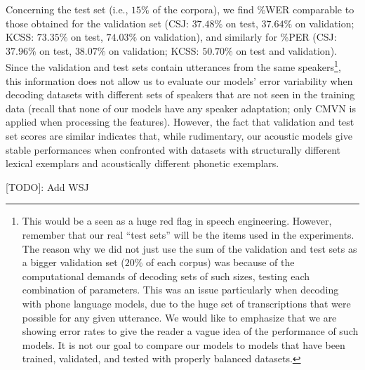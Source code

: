 Concerning the test set (i.e., $15\%$ of the corpora), we find \%WER comparable to those obtained for the validation set (CSJ: $37.48\%$ on test, $37.64\%$ on validation; KCSS: $73.35\%$ on test, $74.03\%$ on validation), and similarly for \%PER (CSJ: $37.96\%$ on test, $38.07\%$ on validation; KCSS: $50.70\%$ on test and validation).
Since the validation and test sets contain utterances from the same speakers\footnote{This would be a seen as a huge red flag in speech engineering. However, remember that our real ``test sets'' will be the items used in the experiments. The reason why we did not just use the sum of the validation and test sets as a bigger validation set ($20\%$ of each corpus) was because of the computational demands of decoding sets of such sizes, testing each combination of parameters. This was an issue particularly when decoding with phone language models, due to the huge set of transcriptions that were possible for any given utterance. We would like to emphasize that we are showing error rates to give the reader a vague idea of the performance of such models. It is not our goal to compare our models to models that have been trained, validated, and tested with properly balanced datasets.}, this information does not allow us to evaluate our models' error variability when decoding datasets with different sets of speakers that are not seen in the training data (recall that none of our models have any speaker adaptation; only CMVN is applied when processing the features). However, the fact that validation and test set scores are similar indicates that, while rudimentary, our acoustic models give stable performances when confronted with datasets with structurally different lexical exemplars and acoustically different phonetic exemplars.   

{\color{red}[TODO]: Add WSJ}



